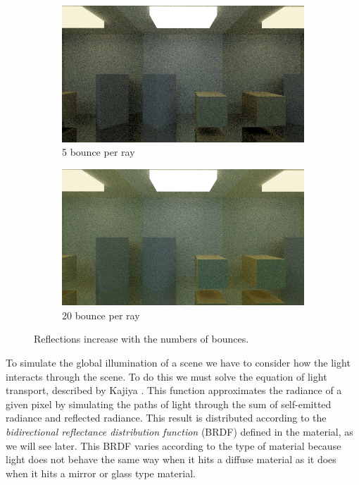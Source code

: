 \documentclass[titlepage,12pt]{report}
\begin{document}
\begin{figure}[H]
	\medskip	
	\begin{subfigure}{.48\textwidth}
		\centering
		\includegraphics[scale=0.315]{media/mirrors_rect/cornell_mirrors_5.png}
		\caption{5 bounce per ray}
		\label{mr_rect_5}
	\end{subfigure}
	\begin{subfigure}{.48\textwidth}
		\centering
		\includegraphics[scale=0.315]{media/mirrors_rect/cornell_mirrors_20.png}	
		\caption{20 bounce per ray}
		\label{mr_rect_20}
	\end{subfigure}
	\caption{Reflections increase with the numbers of bounces.}
	\label{bounces}
\end{figure}

To simulate the global illumination of a scene we have to consider how the light interacts through the scene. To do this we must solve the equation of light transport, described by Kajiya \citep[pp.~143--150]{Kajiya1986}. This function approximates the radiance of a given pixel by simulating the paths of light through the sum of self-emitted radiance and reflected radiance. This result is distributed according to the \textit{bidirectional reflectance distribution function} (BRDF) defined in the material, as we will see later. This BRDF varies according to the type of material because light does not behave the same way when it hits a diffuse material as it does when it hits a mirror or glass type material.
\end{document}
